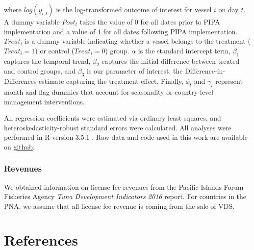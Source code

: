 \documentclass[9p,twocolumn,twoside,lineno]{pnas-new}
\begin{document}
\noindent where $log(y_{i,t})$ is the log-transformed outcome of interest for vessel $i$ on day $t$. A dummy variable $Post_t$ takes the value of 0 for all dates prior to PIPA implementation and a value of 1 for all dates following PIPA implementation. $Treat_i$ is a dummy variable indicating whether a vessel belongs to the treatment ($Treat_i = 1$) or control ($Treat_i = 0$) group. $\alpha$ is the standard intercept term, $\beta_1$ captures the temporal trend, $\beta_2$ captures the initial difference between treated and control groups, and $\beta_3$ is our parameter of interest: the Difference-in-Differences estimate capturing the treatment effect. Finally, $\phi_t$ and $\gamma_i$ represent month and flag dummies that account for seasonality or country-level management interventions. 

All regression coefficients were estimated via ordinary least squares, and heteroskedasticity-robust standard errors were calculated. All analyses were performed in R version 3.5.1 \citep{rcore_2018}. Raw data and code used in this work are available on \href{https://github.com/jcvdav/MPA_displacement}{github}.

\subsubsection{Revenues}

We obtained information on license fee revenues from the Pacific Islands Forum Fisheries Agency \emph{Tuna Development Indicators 2016} report. For countries in the PNA, we assume that all license fee revenue is coming from the sale of VDS.


\section{References}



\end{document}
